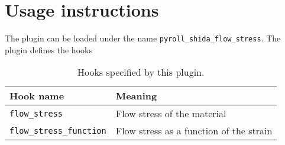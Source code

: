 \documentclass[11pt]{PyRollDocs}
\begin{document}
    \section{Usage instructions}\label{sec:usage-instructions}

    The plugin can be loaded under the name \texttt{pyroll\_shida\_flow\_stress}.
    The plugin defines the hooks

    \begin{table}[h]
        \centering
        \caption{Hooks specified by this plugin.}
        \label{tab:hookspecs}
        \begin{tabular}{ll}
            \toprule
            Hook name                       & Meaning                                 \\
            \midrule
            \texttt{flow\_stress}           & Flow stress of the material             \\
            \texttt{flow\_stress\_function} & Flow stress as a function of the strain \\
            \bottomrule
        \end{tabular}
    \end{table}

    \printbibliography
\end{document}
